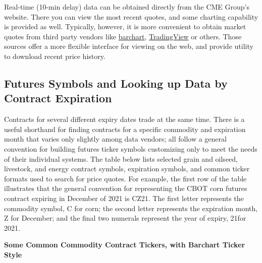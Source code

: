 \documentclass[
  letterpaper,
  DIV=11,
  numbers=noendperiod]{scrreprt}
\begin{document}
Real-time (10-min delay) data can be obtained directly from the CME
Group's website. There you can view the most recent quotes, and some
charting capability is provided as well. Typically, however, it is more
convenient to obtain market quotes from third party vendors like
\href{http://www.barchart.com/futures/marketoverview}{barchart},
\href{https://www.tradingview.com/}{TradingView} or others. Those
sources offer a more flexible interface for viewing on the web, and
provide utility to download recent price history.

\subsection{Futures Symbols and Looking up Data by Contract
Expiration}\label{futures-symbols-and-looking-up-data-by-contract-expiration}

Contracts for several different expiry dates trade at the same time.
There is a useful shorthand for finding contracts for a specific
commodity and expiration month that varies only slightly among data
vendors; all follow a general convention for building futures ticker
symbols customizing only to meet the needs of their individual systems.
The table below lists selected grain and oilseed, livestock, and energy
contract symbols, expiration symbols, and common ticker formats used to
search for price quotes. For example, the first row of the table
illustrates that the general convention for representing the CBOT corn
futures contract expiring in December of 2021 is CZ21. The first letter
represents the commodity symbol, C for corn; the second letter
represents the expiration month, Z for December; and the final two
numerals represent the year of expiry, 21for 2021.

\textbf{Some Common Commodity Contract Tickers, with Barchart Ticker
Style}
\end{document}
